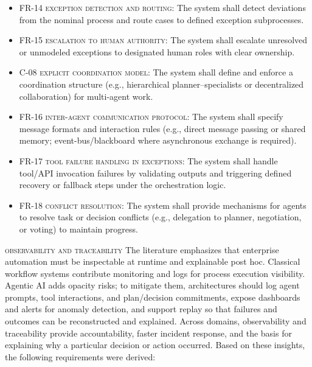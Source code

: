 \begin{itemize}
  \item \textsc{FR-14 exception detection and routing}: The system shall detect deviations from the nominal process and route cases to defined exception subprocesses.
  \item \textsc{FR-15 escalation to human authority}: The system shall escalate unresolved or unmodeled exceptions to designated human roles with clear ownership.
  \item \textsc{C-08 explicit coordination model}: The system shall define and enforce a coordination structure (e.g., hierarchical planner–specialists or decentralized collaboration) for multi-agent work.
  \item \textsc{FR-16 inter-agent communication protocol}: The system shall specify message formats and interaction rules (e.g., direct message passing or shared memory; event-bus/blackboard where asynchronous exchange is required).
  \item \textsc{FR-17 tool failure handling in exceptions}: The system shall handle tool/API invocation failures by validating outputs and triggering defined recovery or fallback steps under the orchestration logic.
  \item \textsc{FR-18 conflict resolution}: The system shall provide mechanisms for agents to resolve task or decision conflicts (e.g., delegation to planner, negotiation, or voting) to maintain progress.
\end{itemize}

\noindent \textsc{observability and traceability} \quad The literature emphasizes that enterprise automation must be inspectable at runtime and explainable post hoc. Classical workflow systems contribute monitoring and logs for process execution visibility. Agentic AI adds opacity risks; to mitigate them, architectures should log agent prompts, tool interactions, and plan/decision commitments, expose dashboards and alerts for anomaly detection, and support replay so that failures and outcomes can be reconstructed and explained. Across domains, observability and traceability provide accountability, faster incident response, and the basis for explaining why a particular decision or action occurred. Based on these insights, the following requirements were derived:

